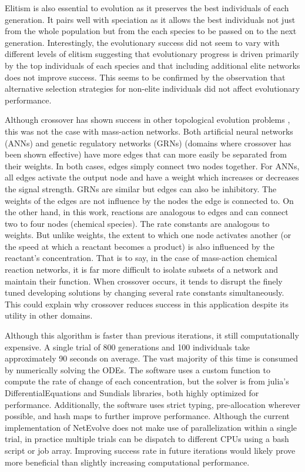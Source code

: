 \documentclass[12pt]{report}
\begin{document}
Elitism is also essential to evolution as it preserves the best individuals of each generation. It pairs well with speciation as it allows the best individuals not just from the whole population but from the each species to be passed on to the next generation. Interestingly, the evolutionary success did not seem to vary with different levels of elitism suggesting that evolutionary progress is driven primarily by the top individuals of each species and that including additional elite networks does not improve success. This seems to be confirmed by the observation that alternative selection strategies for non-elite individuals did not affect evolutionary performance.

Although crossover has shown success in other topological evolution problems \cite{stanley_evolving_2002, dinh_effective_2015}, this was not the case with mass-action networks. Both artificial neural networks (ANNs) and genetic regulatory networks (GRNs) (domains where crossover has been shown effective) have more edges that can more easily be separated from their weights. In both cases, edges simply connect two nodes together. For ANNs, all edges activate the output node and have a weight which increases or decreases the signal strength. GRNs are similar but edges can also be inhibitory. The weights of the edges are not influence by the nodes the edge is connected to. On the other hand, in this work, reactions are analogous to edges and can connect two to four nodes (chemical species). The rate constants are analogous to weights. But unlike weights, the extent to which one node activates another (or the speed at which a reactant becomes a product) is also influenced by the reactant's concentration. That is to say, in the case of mass-action chemical reaction networks, it is far more difficult to isolate subsets of a network and maintain their function. When crossover occurs, it tends to disrupt the finely tuned developing solutions by changing several rate constants simultaneously. This could explain why crossover reduces success in this application despite its utility in other domains. 

Although this algorithm is faster than previous iterations, it still computationally expensive. A single trial of 800 generations and 100 individuals take approximately 90 seconds on average. The vast majority of this time is consumed by numerically solving the ODEs. The software uses a custom function to compute the rate of change of each concentration, but the solver is from julia's DifferentialEquations and Sundials libraries, both highly optimized for performance. Additionally, the software uses strict typing, pre-allocation wherever possible, and hash maps to further improve performance. Although the current implementation of NetEvolve does not make use of parallelization within a single trial, in practice multiple trials can be dispatch to different CPUs using a bash script or job array. Improving success rate in future iterations would likely prove more beneficial than slightly increasing computational performance.
\end{document}

